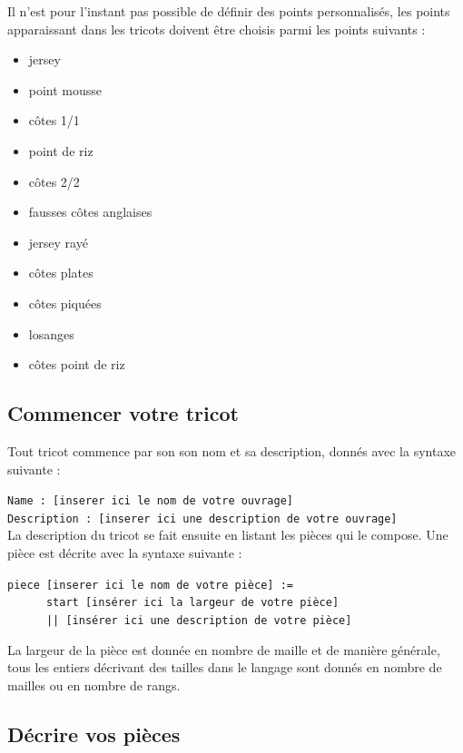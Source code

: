 \documentclass[a4paper,10pt]{article}
\begin{document}
Il n'est pour l'instant pas possible de définir des points personnalisés, les points apparaissant dans les tricots doivent 
être choisis parmi les points suivants :
\begin{itemize}
\item jersey
\item point mousse
\item côtes 1/1
\item point de riz
\item côtes 2/2
\item fausses côtes anglaises
\item jersey rayé
\item côtes plates
\item côtes piquées
\item losanges
\item côtes point de riz
\end{itemize}
  
\subsection{Commencer votre tricot}
  
Tout tricot commence par son son nom et sa description, donnés avec la syntaxe suivante :

\noindent \texttt{Name : [inserer ici le nom de votre ouvrage] \\
  Description : [inserer ici une description de votre ouvrage]} \\

La description du tricot se fait ensuite en listant les pièces qui le compose. Une pièce est décrite avec la syntaxe suivante :

\noindent \texttt{piece [inserer ici le nom de votre pièce] := \\
  \textcolor{white}{alinea}start [insérer ici la largeur de votre pièce] \\
  \textcolor{white}{alinea}|| [insérer ici une description de votre pièce]}
  
La largeur de la pièce est donnée en nombre de maille et de manière générale, tous les entiers décrivant des tailles dans 
le langage sont donnés en nombre de mailles ou en nombre de rangs.

\subsection{Décrire vos pièces}
  
\end{document}
